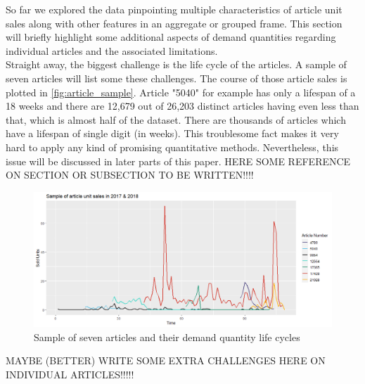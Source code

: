 

So far we explored the data pinpointing multiple characteristics of article unit sales along with other features in an aggregate or grouped frame. This section will briefly highlight some additional aspects of demand quantities regarding individual articles and the associated limitations.
\\

Straight away, the biggest challenge is the life cycle of the articles. A sample of seven articles will list some these challenges. The course of those article sales is plotted in \autoref{fig:article_sample}. Article "5040" for example has only a lifespan of a 18 weeks and there are 12,679 out of 26,203 distinct articles having even less than that, which is almost half of the dataset. There are thousands of articles which have a lifespan of single digit (in weeks). This troublesome fact makes it very hard to apply any kind of promising quantitative methods. Nevertheless, this issue will be discussed in later parts of this paper. HERE SOME REFERENCE ON SECTION OR SUBSECTION TO BE WRITTEN!!!!
\\


\begin{figure}[H]
\centering
  \includegraphics[width=0.95\linewidth]{figures/article_sample.png}
  \caption{Sample of seven articles and their demand quantity life cycles}
  \label{fig:article_sample}
\end{figure}



MAYBE (BETTER) WRITE SOME EXTRA CHALLENGES HERE ON INDIVIDUAL ARTICLES!!!!!



